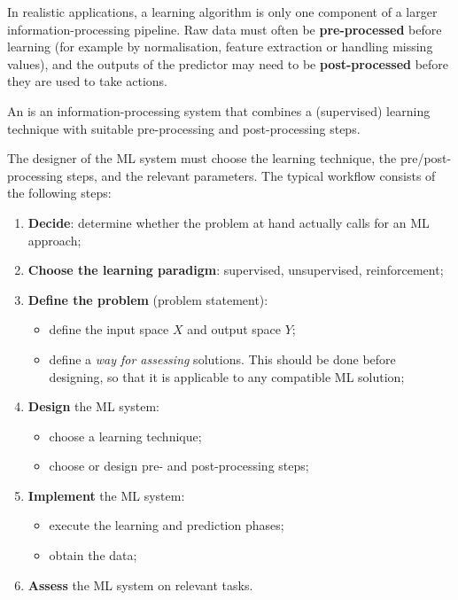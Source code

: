 In realistic applications, a learning algorithm is only one component of a larger information-processing pipeline. Raw data must often be \textbf{pre-processed} before learning (for example by normalisation, feature extraction or handling missing values), and the outputs of the predictor may need to be \textbf{post-processed} before they are used to take actions.

\begin{definitionblock}[ML system]
An  is an information-processing system that combines a (supervised) learning technique with suitable pre-processing and post-processing steps.
\end{definitionblock}

The designer of the ML system must choose the learning technique, the pre/post-processing steps, and the relevant parameters. The typical workflow consists of the following steps:

\begin{enumerate}
  \item \textbf{Decide}: determine whether the problem at hand actually calls for an ML approach;
  \item \textbf{Choose the learning paradigm}: supervised, unsupervised, reinforcement;
  \item \textbf{Define the problem} (problem statement):
  \begin{itemize}
    \item define the input space $X$ and output space $Y$;
    \item define a \emph{way for assessing} solutions. This should be done before designing, so that it is applicable to any compatible ML solution;
  \end{itemize}
  \item \textbf{Design} the ML system:
  \begin{itemize}
    \item choose a learning technique;
    \item choose or design pre- and post-processing steps;
  \end{itemize}
  \item \textbf{Implement} the ML system:
  \begin{itemize}
    \item execute the learning and prediction phases;
    \item obtain the data;
  \end{itemize}
  \item \textbf{Assess} the ML system on relevant tasks.
\end{enumerate}

